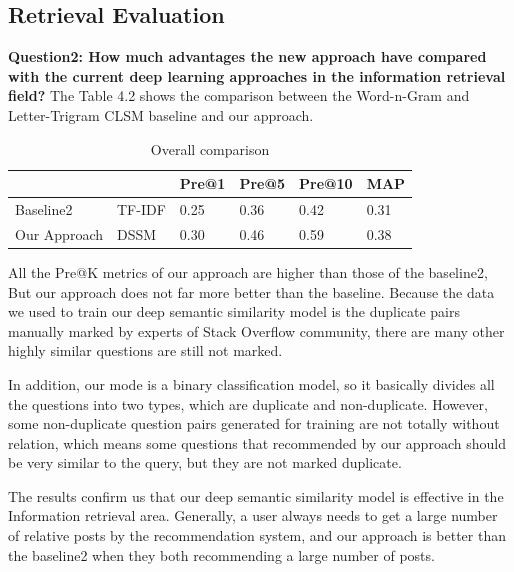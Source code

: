 	\subsection{Retrieval Evaluation}
	{\bf Question2: How much advantages the new approach have compared with the current deep learning approaches in the information retrieval field?}
	The Table 4.2 shows the comparison between the Word-n-Gram and Letter-Trigram CLSM baseline and our approach. 
	\begin{table}[!h]
		\centering
		\label{tab:table7}
		\scriptsize
		\begin{tabular}{|p{2.5cm} p{1.9cm}|p{1.9cm}|p{1.9cm}|p{1.9cm}|p{1.9cm}|}
			\hline    
			& & Pre@1 & Pre@5 & Pre@10 & MAP \\
			\hline
			Baseline2& TF-IDF &  0.25 & 0.36& 0.42 & 0.31   \\
			\hline
			{\scriptsize Our Approach}& DSSM &  0.30 & 0.46 & 0.59 & 0.38 \\
			\hline    
		\end{tabular} 
		\caption{Overall comparison}
	\end{table}	
	All the Pre@K metrics of our approach are higher than those of the baseline2, But our approach does not far more better than the baseline. Because the data we used to train our deep semantic similarity model is the duplicate pairs manually marked by experts of Stack Overflow community, there are many other highly similar questions are still not marked. 
	\par
	In addition, our mode is a binary classification model, so it basically divides all the questions into two types, which are duplicate and non-duplicate. However, some non-duplicate question pairs generated for training are not totally without relation, which means some questions that recommended by our approach should be very similar to the query, but they are not marked duplicate. 
	\par
	The results confirm us that our deep semantic similarity model is effective in the Information retrieval area. Generally, a user always needs to get a large number of relative posts by the recommendation system, and our approach is better than the baseline2 when they both recommending a large number of posts.
	
